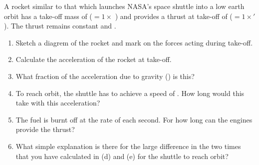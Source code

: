 
\begin{problem}[Robin8]
{A rocket similar to that which launches NASA’s space shuttle into a low earth orbit has a take-off mass of  ($ =  1\times$ ) and provides a thrust at take-off of  ($ = 1\times'$). The thrust remains constant and . 
\begin{enumerate}
	\item Sketch a diagrem of the rocket and mark on the forces acting during take-off.
	\item Calculate the acceleration of the rocket at take-off.
	\item What fraction of the acceleration due to gravity () is this?
	\item To reach orbit, the shuttle has to achieve a speed of .  How long would this take with this acceleration?
	\item The fuel is burnt off at the rate of  each second.  For how long can the engines provide the thrust?
	\item What simple explanation is there for the large difference in the two times that you have calculated in (d) and (e) for the shuttle to reach orbit?
\end{enumerate}
}
{}
{}
\end{problem}